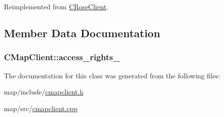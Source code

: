 Reimplemented from \hyperlink{classCRoseClient_ac2e1b4badf1f40ca96fb43f3d4c233fc}{C\+Rose\+Client}.



\subsection{Member Data Documentation}
\subsubsection[{\texorpdfstring{access\+\_\+rights\+\_\+}{access_rights_}}]{ C\+Map\+Client\+::access\+\_\+rights\+\_\+\hspace{0.3cm}{\ttfamily [protected]}}\hypertarget{classCMapClient_aaf50193330eb20eb8cc1f7a048338bbc}{}\label{classCMapClient_aaf50193330eb20eb8cc1f7a048338bbc}


The documentation for this class was generated from the following files\+:\begin{DoxyCompactItemize}
\item 
map/include/\hyperlink{cmapclient_8h}{cmapclient.\+h}\item 
map/src/\hyperlink{cmapclient_8cpp}{cmapclient.\+cpp}\end{DoxyCompactItemize}
